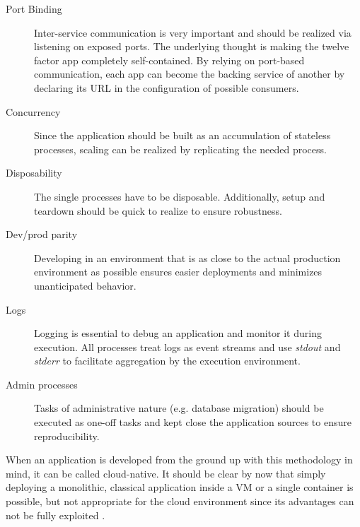 \begin{description}
	\item[Port Binding] Inter-service communication is very important and should be realized via listening on exposed ports. The underlying thought is making the twelve factor app completely self-contained. By relying on port-based communication, each app can become the backing service of another by declaring its URL in the configuration of possible consumers. 
	\item[Concurrency] Since the application should be built as an accumulation of stateless processes, scaling can be realized by replicating the needed process.
	\item[Disposability] The single processes have to be disposable. Additionally, setup and teardown should be quick to realize to ensure robustness. 
	\item[Dev/prod parity] Developing in an environment that is as close to the actual production environment as possible ensures easier deployments and minimizes unanticipated behavior.
	\item[Logs] Logging is essential to debug an application and monitor it during execution. All processes treat logs as event streams and use \textit{stdout} and \textit{stderr} to facilitate aggregation by the execution environment. 
	\item[Admin processes] Tasks of administrative nature (e.g. database migration) should be executed as one-off tasks and kept close the application sources to ensure reproducibility.
\end{description}
\newpage
When an application is developed from the ground up with this methodology in mind, it can be called cloud-native. It should be clear by now that simply deploying a monolithic, classical application inside a VM or a single container is possible, but not appropriate for the cloud environment since its advantages can not be fully exploited \cite{hofmann2017microservices} \cite{12Factor}.

